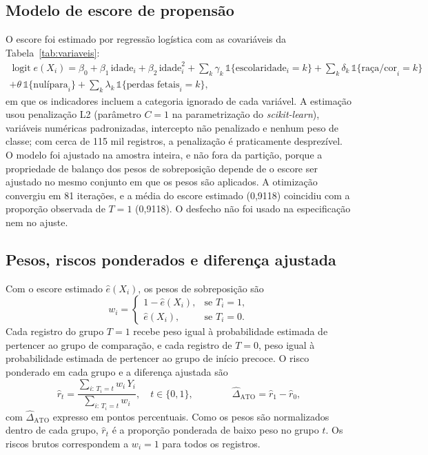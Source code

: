 \documentclass[11pt,a4paper]{article}
\newcommand{\ATO}{\mathrm{ATO}}
\begin{document}
\subsection{Modelo de escore de propensão}

O escore foi estimado por regressão logística com as covariáveis da
Tabela~\ref{tab:variaveis}:
\begin{multline}\label{eq:logit}
\operatorname{logit} e(X_i) = \beta_0 + \beta_1\,\text{idade}_i + \beta_2\,\text{idade}_i^2
 + \sum_{k} \gamma_k\,\mathbb{1}\{\text{escolaridade}_i = k\}
 + \sum_{k} \delta_k\,\mathbb{1}\{\text{raça/cor}_i = k\} \\
 + \theta\,\mathbb{1}\{\text{nulípara}_i\}
 + \sum_{k} \lambda_k\,\mathbb{1}\{\text{perdas fetais}_i = k\},
\end{multline}
em que os indicadores incluem a categoria ignorado de cada variável. A estimação usou
penalização L2 (parâmetro $C = 1$ na parametrização do \emph{scikit-learn}), variáveis
numéricas padronizadas, intercepto não penalizado e nenhum peso de classe; com cerca de
115 mil registros, a penalização é praticamente desprezível. O modelo foi ajustado na
amostra inteira, e não fora da partição, porque a propriedade de balanço dos pesos de
sobreposição depende de o escore ser ajustado no mesmo conjunto em que os pesos são
aplicados. A otimização convergiu em 81 iterações, e a média do escore estimado (0,9118)
coincidiu com a proporção observada de $T=1$ (0,9118). O desfecho não foi usado na
especificação nem no ajuste.

\subsection{Pesos, riscos ponderados e diferença ajustada}

Com o escore estimado $\hat{e}(X_i)$, os pesos de sobreposição são
\begin{equation}\label{eq:pesos}
w_i =
\begin{cases}
1 - \hat{e}(X_i), & \text{se } T_i = 1,\\[2pt]
\hat{e}(X_i), & \text{se } T_i = 0.
\end{cases}
\end{equation}
Cada registro do grupo $T=1$ recebe peso igual à probabilidade estimada de pertencer ao
grupo de comparação, e cada registro de $T=0$, peso igual à probabilidade estimada de
pertencer ao grupo de início precoce. O risco ponderado em cada grupo e a diferença
ajustada são
\begin{equation}\label{eq:risco}
\hat{r}_t = \frac{\sum_{i:\,T_i = t} w_i\,Y_i}{\sum_{i:\,T_i = t} w_i},
\quad t \in \{0, 1\},
\qquad\qquad
\hat{\Delta}_{\ATO} = \hat{r}_1 - \hat{r}_0 ,
\end{equation}
com $\hat{\Delta}_{\ATO}$ expresso em pontos percentuais. Como os pesos são normalizados
dentro de cada grupo, $\hat{r}_t$ é a proporção ponderada de baixo peso no grupo $t$. Os
riscos brutos correspondem a $w_i = 1$ para todos os registros.
\end{document}
